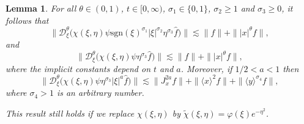 \documentclass[reqno]{amsart}
\newcommand{\lanx}{\langle x \rangle}
\newcommand{\lany}{\langle y \rangle}
\newcommand{\Dt}{\mathcal{D}^{\theta}_\xi}
\newcommand{\sgn}{\text{sgn}}
\numberwithin{equation}{section}
\newtheorem{lemma}[theorem]{Lemma}
\begin{document}
\begin{lemma}\label{Dchip} For all $\theta \in (0,1)$, $t\in [0,\infty)$, $\sigma_1\in \{0,1\}$, $\sigma_2\geq 1$ and $\sigma_3\geq 0$, it follows that
\begin{equation}\label{xi}
\|\Dt\big(\chi(\xi,\eta)\psi \sgn(\xi)^{\sigma_1}|\xi|^{\sigma_2}\eta^{\sigma_3} \hat{f}\big)\|\lesssim\|f\|+\||x|^\theta f\|,
\end{equation}
and
\begin{equation}\label{eta}
\|\Dt\big(\chi(\xi,\eta)\psi \eta^{\sigma_3} \hat{f}\big)\|\lesssim\|f\|+\||x|^\theta f\|,
\end{equation}
where the implicit constants depend on $t$ and $a$.
Moreover, if $1/2<a<1$ then
\begin{equation}\label{Da}
\|\Dt\big(\chi(\xi,\eta)\psi \eta^{\sigma_3} |\xi|^a \hat{f}\big)\|\lesssim\|J_x^{2a}f\|+\|\lanx^2 f\|+\|\lany^{\sigma_4} f\|,
\end{equation}
where  $\sigma_4>1$ is an arbitrary number.

This result still holds if we replace $\chi(\xi,\eta)$ by $\tilde \chi(\xi,\eta)=\varphi(\xi)e^{-\eta^2}$.
\end{lemma}
\end{document}
